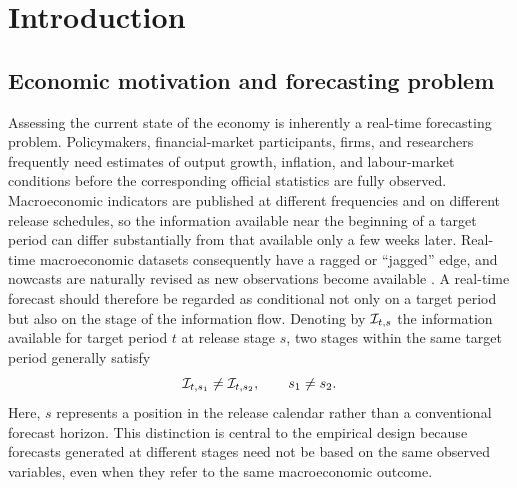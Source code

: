 \section{Introduction}
\label{sec:introduction}

\subsection{Economic motivation and forecasting problem}
\label{subsec:intro_motivation}

Assessing the current state of the economy is inherently a real-time forecasting
problem. Policymakers, financial-market participants, firms, and researchers
frequently need estimates of output growth, inflation, and labour-market
conditions before the corresponding official statistics are fully observed.
Macroeconomic indicators are published at different frequencies and on different
release schedules, so the information available near the beginning of a target
period can differ substantially from that available only a few weeks later.
Real-time macroeconomic datasets consequently have a ragged or ``jagged'' edge,
and nowcasts are naturally revised as new observations become available
\citep{giannone2008nowcasting,banbura2011blackbox}. A real-time forecast should
therefore be regarded as conditional not only on a target period but also on the
stage of the information flow. Denoting by $\mathcal{I}_{t,s}$ the information available
for target period $t$ at release stage $s$, two stages within the same target
period generally satisfy
\begin{equation}
    \mathcal{I}_{t,s_1} \neq \mathcal{I}_{t,s_2},
    \qquad s_1 \neq s_2.
    \label{eq:stage_information_sets}
\end{equation}
Here, $s$ represents a position in the release calendar rather than a conventional
forecast horizon. This distinction is central to the empirical design because
forecasts generated at different stages need not be based on the same observed
variables, even when they refer to the same macroeconomic outcome.

